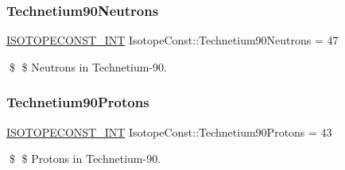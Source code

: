 \subsubsection{\texorpdfstring{Technetium90\+Neutrons}{Technetium90Neutrons}}
{\footnotesize\ttfamily \mbox{\hyperlink{group___isotope_const-_macros_ga5f18360b3e99483a35c32d789e62621c}{I\+S\+O\+T\+O\+P\+E\+C\+O\+N\+S\+T\+\_\+\+I\+NT}} Isotope\+Const\+::\+Technetium90\+Neutrons = 47}

\$ \$ Neutrons in Technetium-\/90. \mbox{\label{group___isotope_const-_technetium-_tc90_ga8322acf9a7c5869951b5f93e4c804bc0}} 
\subsubsection{\texorpdfstring{Technetium90\+Protons}{Technetium90Protons}}
{\footnotesize\ttfamily \mbox{\hyperlink{group___isotope_const-_macros_ga5f18360b3e99483a35c32d789e62621c}{I\+S\+O\+T\+O\+P\+E\+C\+O\+N\+S\+T\+\_\+\+I\+NT}} Isotope\+Const\+::\+Technetium90\+Protons = 43}

\$ \$ Protons in Technetium-\/90. 